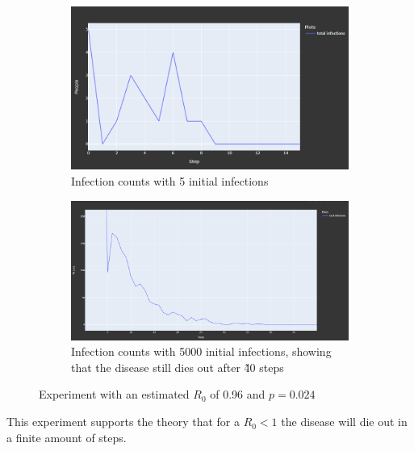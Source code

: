 \begin{figure}
    \centering
    \begin{subfigure}[b]{0.475\textwidth}
        \centering
        \includegraphics[width=\textwidth]{images/exp_r0_small_1.png}
        \caption[Network2]%
        {{\small Infection counts with 5 initial infections}}   
    \end{subfigure}
    \hfill
    \begin{subfigure}[b]{0.475\textwidth}  
        \centering 
        \includegraphics[width=\textwidth]{images/exp_r0_success.png}
        \caption[]%
        {{\small Infection counts with 5000 initial infections, showing that the disease
        still dies out after \~40 steps}}    
    \end{subfigure}
    \caption[ Experiment with an estimated $R_0$ of 0.96 and $p = 0.024$ ]
    {\small Experiment with an estimated $R_0$ of 0.96 and $p = 0.024$} 
    \label{fig:exp_r0_small}
\end{figure}



This experiment supports the theory that for a $R_0 < 1$ the disease will die out in a finite amount of steps. 

